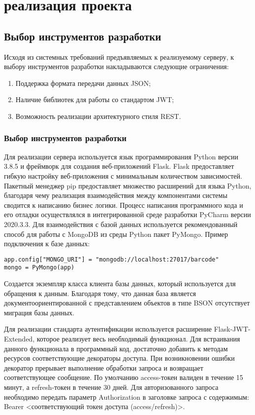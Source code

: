 \section{реализация проекта}
\subsection{Выбор инструментов разработки}
Исходя из системных требований предъявляемых к реализуемому серверу, к выбору инструментов разработки накладываются следующие ограничения:
\begin{enumerate}
	\item Поддержка формата передачи данных JSON;
	\item Наличие библиотек для работы со стандартом JWT;
	\item Возможность реализации архитектурного стиля REST.
\end{enumerate}
\subsubsection{Выбор инструментов разработки}
Для реализации сервера используется язык программирования Python версии 3.8.5 и фреймворк для создания веб-приложений
Flask. Flask предоставляет гибкую настройку веб-приложения с минимальным количеством зависимостей. Пакетный менеджер pip предоставляет множество расширений для языка Python, благодаря чему реализация взаимодействия между компонентами системы сводится к написанию бизнес логики. Процесс написания программного кода и его отладки осуществлялся в интегрированной среде разработки PyCharm версии 2020.3.3. Для взаимодействия с базой данных используется рекомендованный способ для работы с MongoDB из среды Python пакет PyMongo. Пример подключения к базе данных:
\begin{lstlisting}
app.config["MONGO_URI"] = "mongodb://localhost:27017/barcode"
mongo = PyMongo(app)
\end{lstlisting}
Создается экземпляр класса клиента базы данных, который используется для обращения к данным. Благодаря тому, что данная база является документоориентированной с представлением объектов в типе BSON отсутствует миграция базы данных.

Для реализации стандарта аутентификации используется расширение
Flask-JWT-Extended, которое реализует весь необходимый функционал. Для встраивания данного функционала в программный код, достаточно добавить к методам ресурсов соответствующие декораторы доступа. При возникновении ошибки декоратор прерывает выполнение обработки запроса и возвращает соответствующее сообщение. По умолчанию access-токен валиден в течение 15 минут, а refresh-токен в течение 30 дней. Для авторизованного запроса необходимо передать параметр Authorization в заголовке запроса с содержимым: Bearer <соответствующий токен доступа (access/refresh)>.


